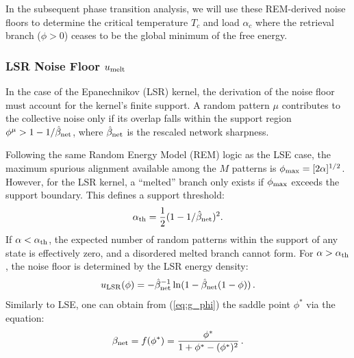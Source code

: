 \documentclass{article}
\theoremstyle{plain}
\theoremstyle{definition}
\theoremstyle{remark}
\begin{document}
In the subsequent phase transition analysis, we will use these REM-derived noise floors to determine the critical temperature $T_c$ and load $\alpha_c$ where the retrieval branch ($\phi > 0$) ceases to be the global minimum of the free energy.

\subsubsection{LSR Noise Floor $u_{\rm melt}$}

In the case of the Epanechnikov (LSR) kernel, the derivation of the noise floor must account for the kernel's finite support. A random pattern $\mu$ contributes to the collective noise only if its overlap falls within the support region $\phi^\mu > 1 - 1/\hat\beta_{\rm net}$, where $\hat\beta_{\rm net}$ is the rescaled network sharpness.

Following the same Random Energy Model (REM) logic as the LSE case, the maximum spurious alignment available among the $M$ patterns is $\phi_{\rm max} = [2\alpha]^{1/2}$. However, for the LSR kernel, a ``melted'' branch only exists if $\phi_{\rm max}$ exceeds the support boundary. This defines a support threshold:
\begin{equation}
    \alpha_{\rm th} = \frac{1}{2} (1 - 1/\hat\beta_{\rm net})^2 .
    \label{eq:alpha_th}
\end{equation}
If $\alpha < \alpha_{\rm th}$, the expected number of random patterns within the support of any state is effectively zero, and a disordered melted branch cannot form. For $\alpha > \alpha_{\rm th}$, the noise floor is determined by the LSR energy density:
\begin{equation}
    u_{\rm LSR}(\phi) = -\hat\beta_{\rm net}^{-1} \ln ( 1 - \hat\beta_{\rm net}(1 - \phi) )\,.
\end{equation}
Similarly to LSE, one can obtain from (\ref{eq:g_phi}) the saddle point $\phi^*$ via the equation:
\begin{equation}
    \beta_{\rm net} = f(\phi^*) = \frac{\phi^*}{1 + \phi^* - (\phi^*)^2}\,.
\end{equation}
\end{document}
